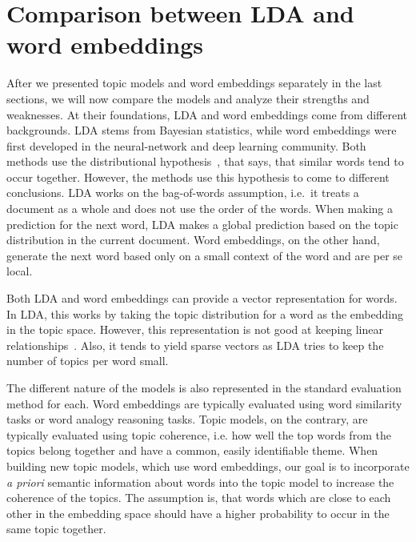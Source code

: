 \documentclass[
        a4paper,
        titlepage,
        twoside,
        parskip,
        numbers=noenddot
        ]{scrbook}
\theoremstyle{break}
\begin{document}
\section{Comparison between LDA and word embeddings}

After we presented topic models and word embeddings separately in the last sections, we will now compare the models and analyze their strengths and weaknesses.
At their foundations, LDA and word embeddings come from different backgrounds.
LDA stems from Bayesian statistics, while word embeddings were first developed in the neural-network and deep learning community.
Both methods use the distributional hypothesis~\cite{Firth1957}, that says, that similar words tend to occur together.
However, the methods use this hypothesis to come to different conclusions.
LDA works on the bag-of-words assumption, i.e.\ it treats a document as a whole and does not use the order of the words.
When making a prediction for the next word, LDA makes a global prediction based on the topic distribution in the current document.
Word embeddings, on the other hand, generate the next word based only on a small context of the word and are per se local.

Both LDA and word embeddings can provide a vector representation for words.
In LDA, this works by taking the topic distribution for a word as the embedding in the topic space.
However, this representation is not good at keeping linear relationships~\cite{Mikolov2013b,Mikolov2013a}.
Also, it tends to yield sparse vectors as LDA tries to keep the number of topics per word small.

The different nature of the models is also represented in the standard evaluation method for each.
Word embeddings are typically evaluated using word similarity tasks or word analogy reasoning tasks.
Topic models, on the contrary, are typically evaluated using topic coherence, i.e. how well the top words from the topics belong together and have a common, easily identifiable theme.
When building new topic models, which use word embeddings, our goal is to incorporate \emph{a priori} semantic information about words into the topic model to increase the coherence of the topics.
The assumption is, that words which are close to each other in the embedding space should have a higher probability to occur in the same topic together.
\end{document}

